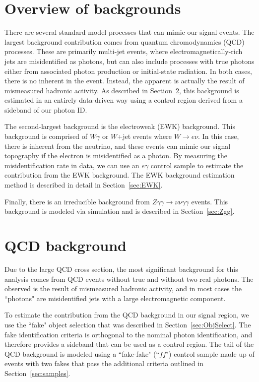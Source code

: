 \section{Overview of backgrounds}

There are several standard model processes that can mimic our signal events. The largest background contribution comes from quantum chromodynamics (QCD) processes. These are primarily multi-jet events, where electromagnetically-rich jets are misidentified as photons, but can also include processes with true photons either from associated photon production or initial-state radiation. In both cases, there is no inherent \ETmiss in the event. Instead, the apparent \ETmiss is actually the result of mismeasured hadronic activity. As described in Section~\ref{sec:QCD}, this background is estimated in an entirely data-driven way using a control region derived from a sideband of our photon ID. 

The second-largest background is the electroweak (EWK) background. This background is comprised of $W\gamma$ or $W$+jet events where $W\rightarrow e \nu$. In this case, there is inherent \ETmiss from the neutrino, and these events can mimic our signal topography if the electron is misidentified as a photon. By measuring the misidentification rate in data, we can use an $e\gamma$ control sample to estimate the contribution from the EWK background. The EWK background estimation method is described in detail in Section~\ref{sec:EWK}. 

Finally, there is an irreducible background from $Z\gamma\gamma\rightarrow\nu\nu\gamma\gamma$ events. This background is modeled via simulation and is described in Section~\ref{sec:Zgg}.


\section{QCD background}
\label{sec:QCD}

Due to the large QCD cross section, the most significant background for this analysis 
comes from QCD events without true \ETmiss and without two real photons. 
The observed \ETmiss is the result of mismeasured hadronic activity, and in most cases the 
``photons" are misidentified jets with a large electromagnetic component.

To estimate the contribution from the QCD background in our signal region, we use the ``fake" object selection that was described in Section~\ref{sec:ObjSelect}. The fake identification criteria is orthogonal to the nominal photon identification, and therefore provides a sideband that can be used as a control region. The \ETmiss tail of the QCD background is modeled using a ``fake-fake" (``$ff$") control sample made up of events with two fakes that pass the additional criteria outlined in Section~\ref{sec:samples}.

